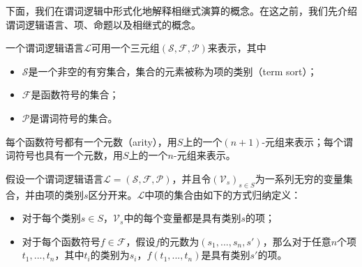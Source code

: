 下面，我们在谓词逻辑中形式化地解释相继式演算的概念。在这之前，我们先介绍谓词逻辑语言、项、命题以及相继式的概念。
\begin{definition}[谓词逻辑语言]
	一个谓词逻辑语言$\mathcal{L}$可用一个三元组$(\mathcal{S}, \mathcal{F}, \mathcal{P})$来表示，其中
	\begin{itemize}
		\item $\mathcal{S}$是一个非空的有穷集合，集合的元素被称为项的类别（term sort）；
		\item $\mathcal{F}$是函数符号的集合；
		\item $\mathcal{P}$是谓词符号的集合。
	\end{itemize}
	每个函数符号都有一个元数（arity），用$S$上的一个$(n+1)$-元组来表示；每个谓词符号也具有一个元数，用$S$上的一个$n$-元组来表示。
	
\end{definition}

\begin{definition}[项]
	假设一个谓词逻辑语言$\mathcal{L}=(\mathcal{S}, \mathcal{F}, \mathcal{P})$，并且令$(\mathcal{V}_s)_{s\in S}$为一系列无穷的变量集合，并由项的类别$s$区分开来。$\mathcal{L}$中项的集合由如下的方式归纳定义：
		\begin{itemize}
		\item 对于每个类别$s\in S$，$\mathcal{V}_s$中的每个变量都是具有类别$s$的项；
		\item 对于每个函数符号$f\in\mathcal{F}$，假设$f$的元数为$(s_1,...,s_n, s')$，那么对于任意$n$个项$t_1,...,t_n$，其中$t_i$的类别为$s_i$，$f(t_1,...,t_n)$是具有类别$s'$的项。
	\end{itemize}
\end{definition}

